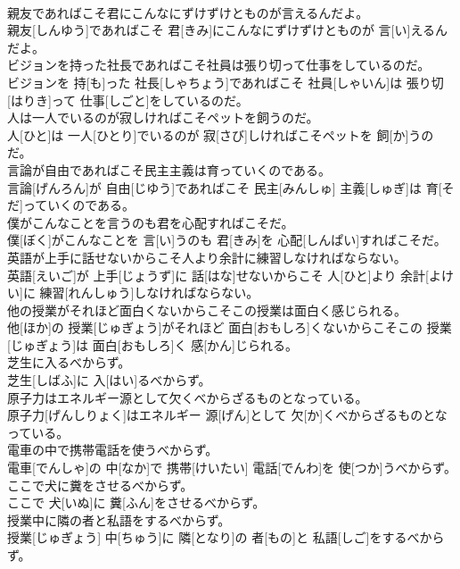 \documentclass[8pt]{extreport}
\begin{document}
\begin{CJK}{UTF8}{min}
\\	親友であればこそ君にこんなにずけずけとものが言えるんだよ。	
\\	親友[しんゆう]であればこそ 君[きみ]にこんなにずけずけとものが 言[い]えるんだよ。
\\	ビジョンを持った社長であればこそ社員は張り切って仕事をしているのだ。	
\\	ビジョンを 持[も]った 社長[しゃちょう]であればこそ 社員[しゃいん]は 張り切[はりき]って 仕事[しごと]をしているのだ。
\\	人は一人でいるのが寂しければこそペットを飼うのだ。	
\\	人[ひと]は 一人[ひとり]でいるのが 寂[さび]しければこそペットを 飼[か]うのだ。
\\	言論が自由であればこそ民主主義は育っていくのである。	
\\	言論[げんろん]が 自由[じゆう]であればこそ 民主[みんしゅ] 主義[しゅぎ]は 育[そだ]っていくのである。
\\	僕がこんなことを言うのも君を心配すればこそだ。	
\\	僕[ぼく]がこんなことを 言[い]うのも 君[きみ]を 心配[しんぱい]すればこそだ。
\\	英語が上手に話せないからこそ人より余計に練習しなければならない。	
\\	英語[えいご]が 上手[じょうず]に 話[はな]せないからこそ 人[ひと]より 余計[よけい]に 練習[れんしゅう]しなければならない。
\\	他の授業がそれほど面白くないからこそこの授業は面白く感じられる。	
\\	他[ほか]の 授業[じゅぎょう]がそれほど 面白[おもしろ]くないからこそこの 授業[じゅぎょう]は 面白[おもしろ]く 感[かん]じられる。
\\	芝生に入るべからず。	
\\	芝生[しばふ]に 入[はい]るべからず。
\\	原子力はエネルギー源として欠くべからざるものとなっている。	
\\	原子力[げんしりょく]はエネルギー 源[げん]として 欠[か]くべからざるものとなっている。
\\	電車の中で携帯電話を使うべからず。	
\\	電車[でんしゃ]の 中[なか]で 携帯[けいたい] 電話[でんわ]を 使[つか]うべからず。
\\	ここで犬に糞をさせるべからず。	
\\	ここで 犬[いぬ]に 糞[ふん]をさせるべからず。
\\	授業中に隣の者と私語をするべからず。	
\\	授業[じゅぎょう] 中[ちゅう]に 隣[となり]の 者[もの]と 私語[しご]をするべからず。

\end{CJK}
\end{document}
